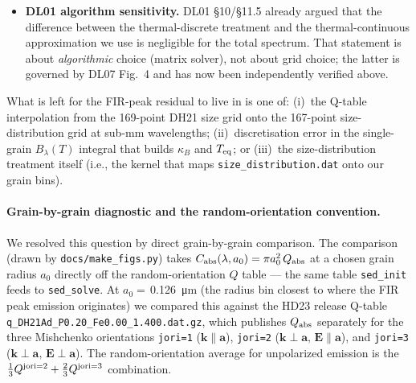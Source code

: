 \documentclass{my_memo}
\newcommand{\Teq}{\ensuremath{T_{\rm eq}}}
\let\mathbf\boldsymbol
\begin{document}
\begin{itemize}
        Band-integrated SED ratios change by at most $0.28\%$ (the
        1--\SI{5}{\micro\meter} band) between the two algorithms, and by
        at most $0.16\%$ longward of \SI{5}{\micro\meter}, with either
        the default or the HD23 field (remeasured 2026-10-31 from
        \texttt{./calc\_sed.x astrodust draine} and \texttt{draine
        hd23}); the diagnostic counter shows that
        81 astrodust grains in Stage S1 and 83 in Stage S2 process
        stochastically in the 2026-10-31 default heuristic run (70 and 73 in
        the iterative run); the rest enter
        equilibrium through the solver gate. The iterative refinement does
        change the $T$ window for those grains -- it just does not
        change the band-integrated SED. \emph{Grid choice is not the
        source of the FIR deficit either.}
  \item \textbf{DL01 algorithm sensitivity.} DL01 \S10/\S11.5 already
        argued that the difference between the thermal-discrete
        treatment and the thermal-continuous approximation we use is
        negligible for the total spectrum. That statement is about
        \emph{algorithmic} choice (matrix solver), not about grid
        choice; the latter is governed by DL07 Fig.~4 and has now
        been independently verified above.
\end{itemize}

What is left for the FIR-peak residual to live in is one of:
(i)~the Q-table interpolation from the 169-point DH21 size grid onto
the 167-point size-distribution grid at sub-mm wavelengths;
(ii)~discretisation error in the single-grain $B_\lambda(T)$ integral
that builds $\kappa_B$ and \Teq; or (iii)~the size-distribution
treatment itself (i.e., the kernel that maps
\texttt{size\_distribution.dat} onto our grain bins).

\paragraph{Grain-by-grain diagnostic and the random-orientation convention.}
We resolved this question by direct grain-by-grain comparison.
The comparison (drawn by \texttt{docs/make\_figs.py}) takes
$C_{\rm abs}(\lambda, a_0) = \pi a_0^2\,Q_{\rm abs}$ at a chosen grain
radius $a_0$ directly off the random-orientation $Q$ table --- the same
table \texttt{sed\_init} feeds to \texttt{sed\_solve}.
At $a_0 = $\,\SI{0.126}{\micro\meter} (the radius bin closest to where
the FIR peak emission originates) we compared this against
the HD23 release Q-table \texttt{q\_DH21Ad\_P0.20\_Fe0.00\_1.400.dat.gz},
which publishes $Q_{\rm abs}$ separately for the three Mishchenko
orientations
\texttt{jori=1} ($\mathbf{k}\parallel\mathbf{a}$),
\texttt{jori=2} ($\mathbf{k}\perp\mathbf{a},\, \mathbf{E}\parallel\mathbf{a}$), and
\texttt{jori=3} ($\mathbf{k}\perp\mathbf{a},\, \mathbf{E}\perp\mathbf{a}$). The
random-orientation average for unpolarized emission is the
$\tfrac{1}{3}Q^{\rm jori=2} + \tfrac{2}{3}Q^{\rm jori=3}$ combination.
\end{document}
